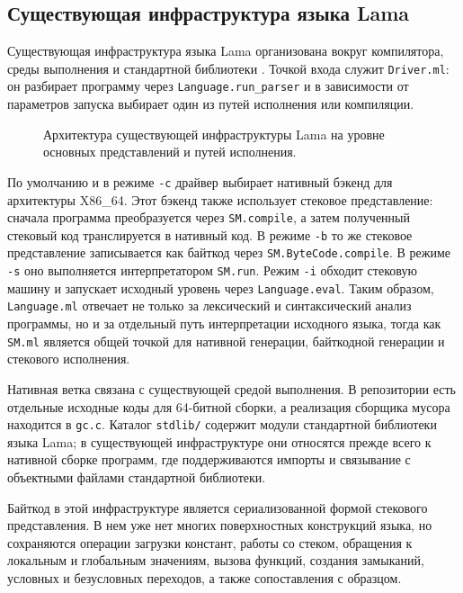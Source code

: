 \subsection{Существующая инфраструктура языка Lama}

Существующая инфраструктура языка Lama организована вокруг компилятора, среды выполнения и
стандартной библиотеки \cite{LamaReadme}. Точкой входа служит \verb=Driver.ml=: он разбирает
программу через \verb=Language.run_parser= и в зависимости от параметров запуска выбирает один из
путей исполнения или компиляции.

\begin{figure}[H]
    \centering
    \resizebox{\textwidth}{!}{}
    \caption{Архитектура существующей инфраструктуры Lama на уровне основных представлений и путей исполнения.}
    \label{fig:lama-current-infrastructure}
\end{figure}

По умолчанию и в режиме
\verb=-c= драйвер выбирает нативный бэкенд для архитектуры X86\_64. Этот бэкенд также
использует стековое представление: сначала программа преобразуется через
\verb=SM.compile=, а затем полученный стековый код транслируется в нативный
код. В режиме \verb=-b= то же стековое представление записывается как байткод
через \verb=SM.ByteCode.compile=. В режиме \verb=-s= оно выполняется
интерпретатором \verb=SM.run=. Режим \verb=-i= обходит стековую машину и
запускает исходный уровень через \verb=Language.eval=. Таким образом,
\verb=Language.ml= отвечает не только за лексический и синтаксический анализ
программы, но и за отдельный путь интерпретации исходного языка, тогда как
\verb=SM.ml= является общей точкой для нативной генерации, байткодной
генерации и стекового исполнения.

Нативная ветка связана с существующей средой выполнения. В репозитории есть
отдельные исходные коды для 64-битной сборки, а реализация сборщика
мусора находится в \verb=gc.c=. Каталог \verb=stdlib/= содержит модули стандартной
библиотеки языка Lama; в
существующей инфраструктуре они относятся прежде всего к нативной сборке
программ, где поддерживаются импорты и связывание с объектными файлами
стандартной библиотеки.

Байткод в этой инфраструктуре является сериализованной формой стекового
представления. В нем уже нет многих поверхностных конструкций языка, но
сохраняются операции загрузки констант, работы со стеком, обращения к локальным
и глобальным значениям, вызова функций, создания замыканий, условных и
безусловных переходов, а также сопоставления с образцом.

